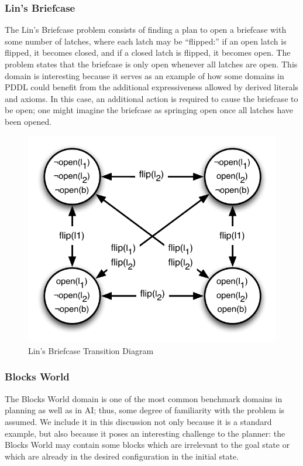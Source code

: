\subsubsection{Lin's Briefcase}
The Lin's Briefcase problem consists of finding a plan to open a briefcase with some number of latches, where each latch may be ``flipped:'' if an open latch is flipped, it becomes closed, and if a closed latch is flipped, it becomes open. The problem states that the briefcase is only open whenever all latches are open. This domain is interesting because it serves as an example of how some domains in PDDL could benefit from the additional expressiveness allowed by derived literals and axioms. In this case, an additional action is required to cause the briefcase to be open; one might imagine the briefcase as springing open once all latches have been opened.

\begin{figure}[htbp]
    \centering
        \includegraphics[scale=.5]{../images/briefcase.pdf}
    \caption{Lin's Briefcase Transition Diagram}
    \label{fig:briefcase}
\end{figure}



\subsubsection{Blocks World}
The Blocks World domain is one of the most common benchmark domains in planning as well as in AI; thus, some degree of familiarity with the problem is assumed. We include it in this discussion not only because it is a standard example, but also because it poses an interesting challenge to the planner: the Blocks World may contain some blocks which are irrelevant to the goal state or which are already in the desired configuration in the initial state. 

